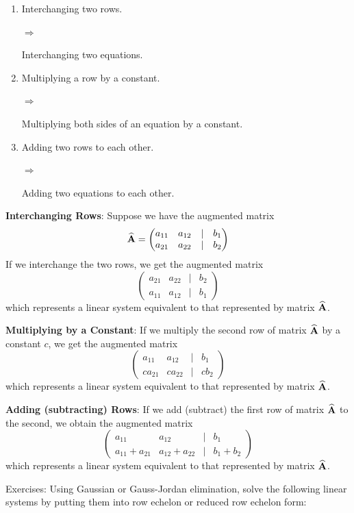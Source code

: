 \documentclass[]{book}
\theoremstyle{definition}
\theoremstyle{definition}
\theoremstyle{definition}
\theoremstyle{remark}
\begin{document}
\begin{enumerate}
        \item \parbox[t]{2.5in}{Interchanging two rows.}$\Longrightarrow\qquad$ \parbox[t]{2.5in}{Interchanging two equations.}
        \item \parbox[t]{2.5in}{Multiplying a row by a constant.}$\Longrightarrow\qquad$ \parbox[t]{2.5in}{Multiplying both sides of an equation by a constant.}
        \item \parbox[t]{2.5in}{Adding two rows to each other.}$\Longrightarrow\qquad$ \parbox[t]{2.5in}{Adding two equations to each other.}
    \end{enumerate}

\textbf{Interchanging Rows}: Suppose we have the augmented matrix
\[{\widehat{\bf A}}=\begin{pmatrix} a_{11} & a_{12} & | & b_1\\
            a_{21} & a_{22} & | & b_2 
            \end{pmatrix}\] If we interchange the two rows, we get the
augmented matrix \[\begin{pmatrix}
            a_{21} & a_{22} & | & b_2\\
            a_{11} & a_{12} & | & b_1
            \end{pmatrix}\] which represents a linear system equivalent
to that represented by matrix \(\widehat{\bf A}\).

\textbf{Multiplying by a Constant}: If we multiply the second row of
matrix \(\widehat{\bf A}\) by a constant \(c\), we get the augmented
matrix \[\begin{pmatrix}
            a_{11} & a_{12} & | & b_1\\
            c a_{21} & c a_{22} & | & c b_2
            \end{pmatrix}\] which represents a linear system equivalent
to that represented by matrix \(\widehat{\bf A}\).

\textbf{Adding (subtracting) Rows}: If we add (subtract) the first row
of matrix \(\widehat{\bf A}\) to the second, we obtain the augmented
matrix \[\begin{pmatrix}
            a_{11} & a_{12} & | & b_1\\
            a_{11}+a_{21} & a_{12}+a_{22} & | & b_1+b_2
            \end{pmatrix}\] which represents a linear system equivalent
to that represented by matrix \(\widehat{\bf A}\).

Exercises: Using Gaussian or Gauss-Jordan elimination, solve the
following linear systems by putting them into row echelon or reduced row
echelon form:
\end{document}
